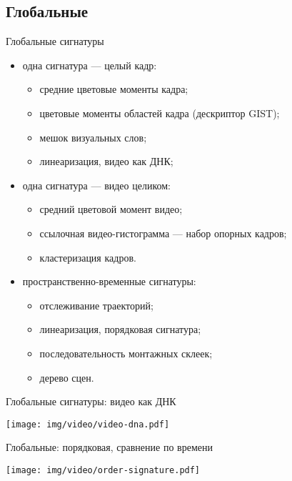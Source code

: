 

\subsection{Глобальные}

\begin{frame}{Глобальные сигнатуры}

    \begin{itemize}
        \item одна сигнатура — целый кадр:
        \begin{itemize}
            \item  средние цветовые моменты кадра;
            \item  цветовые моменты областей кадра (дескриптор GIST);
            \item  мешок визуальных слов;
            \item  линеаризация, видео как ДНК;
        \end{itemize}
        \item одна сигнатура — видео целиком:
        \begin{itemize}
            \item   средний цветовой момент видео;
            \item   ссылочная видео-гистограмма — набор опорных кадров;
            \item   кластеризация кадров.
        \end{itemize}
        \item пространственно-временные сигнатуры:
        \begin{itemize}
            \item   отслеживание траекторий;
            \item   линеаризация, порядковая сигнатура;
            \item   последовательность монтажных склеек;
            \item   дерево сцен.
        \end{itemize}
    \end{itemize}

\end{frame}

\begin{frame}{Глобальные сигнатуры: видео как ДНК}
    \begin{center}
        \texttt{[image: img/video/video-dna.pdf]}
    \end{center}
\end{frame}


\begin{frame}{Глобальные: порядковая, сравнение по времени}
    \begin{center}
        \texttt{[image: img/video/order-signature.pdf]}
    \end{center}
\end{frame}


